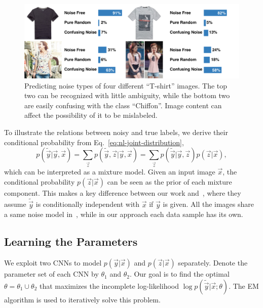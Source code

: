\begin{figure}[t]
\begin{center}
\includegraphics[width=1.0\linewidth]{figures/noisy_labels/noise_level.pdf}
\end{center}
\caption{Predicting noise types of four different ``T-shirt'' images. The top two can be recognized with little ambiguity, while the bottom two are easily confusing with the class ``Chiffon''. Image content can affect the possibility of it to be mislabeled.}
\label{fig:nl-compare-noise-level}
\end{figure}

To illustrate the relations between noisy and true labels, we derive their conditional probability from Eq.~\ref{eq:nl-joint-distribution},
\begin{equation}
    p(\tilde{\vec{y}} | \vec{y}, \vec{x}) = \sum_{\vec{z}} p(\tilde{\vec{y}}, \vec{z} | \vec{y}, \vec{x}) = \sum_{\vec{z}} p(\tilde{\vec{y}} | \vec{y}, \vec{z}) p(\vec{z} | \vec{x}),
\end{equation}
which can be interpreted as a mixture model. Given an input image $\vec{x}$, the conditional probability $p(\vec{z} | \vec{x})$ can be seen as the prior of each mixture component. This makes a key difference between our work and~\cite{sukhbaatar2014learning}, where they assume $\tilde{\vec{y}}$ is conditionally independent with $\vec{x}$ if $\vec{y}$ is given. All the images share a same noise model in~\cite{sukhbaatar2014learning}, while in our approach each data sample has its own.

\subsection{Learning the Parameters} %
\label{sub:nl-learning-the-parameters}
We exploit two CNNs to model $p(\vec{y} | \vec{x})$ and $p(\vec{z} | \vec{x})$ separately. Denote the parameter set of each CNN by $\theta_1$ and $\theta_2$. Our goal is to find the optimal $\theta = \theta_1 \cup \theta_2$ that maximizes the incomplete log-likelihood $\log p(\tilde{\vec{y}} | \vec{x}; \theta)$. The EM algorithm is used to iteratively solve this problem.

